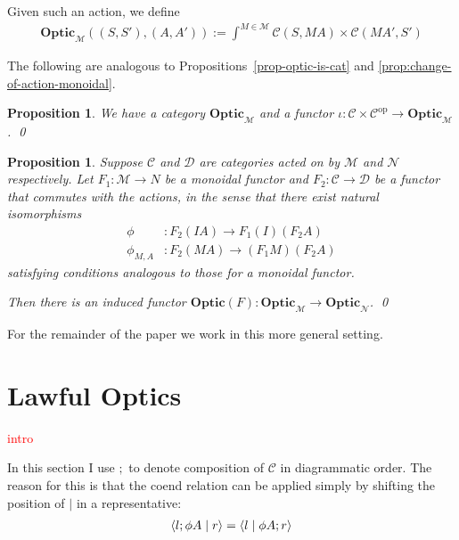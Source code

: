 \documentclass[11pt,a4paper]{article}
\theoremstyle{plain}
\newtheorem{proposition}[theorem]{Proposition}
\theoremstyle{definition}
\newtheorem{remark}[theorem]{Remark}
\newcommand{\C}{\mathscr{C}}
\newcommand{\D}{\mathscr{D}}
\newcommand{\M}{\mathscr{M}}
\newcommand{\N}{\mathscr{N}}
\newcommand{\Optic}{\mathbf{Optic}}
\newcommand{\op}{\mathrm{op}}
\newcommand{\rep}[2]{{\ensuremath \left\langle #1 \mid #2 \right\rangle}}
\newcommand{\todo}[1]{\textcolor{red}{\small #1}}
\begin{document}
Given such an action, we define
\begin{align*}
  \Optic_\M((S, S'), (A, A')) := \int^{M \in \M} \C(S, MA) \times \C(MA', S')
\end{align*}

The following are analogous to Propositions~\ref{prop-optic-is-cat} and \ref{prop:change-of-action-monoidal}.

\begin{proposition}
  We have a category $\Optic_\M$ and a functor $\iota : \C \times \C^\op \to \Optic_\M$. \qed
\end{proposition}

\begin{proposition}\label{prop:change-of-action}
  Suppose $\C$ and $\D$ are categories acted on by $\M$ and $\mathcal{N}$ respectively. Let $F_1 : \M \to N$ be a monoidal functor and $F_2 : \C \to \D$ be a functor that commutes with the actions, in the sense that there exist natural isomorphisms
  \begin{align*}
  \phi &: F_2(I A) \to F_1(I)(F_2A) \\
  \phi_{M,A} &: F_2(MA) \to (F_1 M)(F_2 A) 
  \end{align*}
satisfying conditions analogous to those for a monoidal functor.
  
Then there is an induced functor $\Optic(F) : \Optic_\M \to \Optic_\N$. \qed
\end{proposition}

For the remainder of the paper we work in this more general setting.


\section{Lawful Optics}\label{sec:lawful-optics}
\todo{intro}

In this section I use $;$ to denote composition of $\C$ in diagrammatic order. The reason for this is that the coend relation can be applied simply by shifting the position of $\mid$ in a representative:
\begin{align*}
\rep{l;\phi A}{r} = \rep{l}{\phi A;r}
\end{align*}
\end{document}
